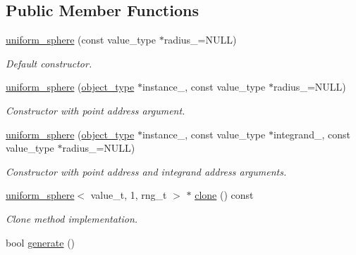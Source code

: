 \subsection*{Public Member Functions}
\begin{DoxyCompactItemize}
\item 
\hypertarget{a00567_a875be167ffb06c494c21cd9a60e8099a}{}\hyperlink{a00567_a875be167ffb06c494c21cd9a60e8099a}{uniform\+\_\+sphere} (const value\+\_\+type $\ast$radius\+\_\+=N\+U\+L\+L)\label{a00567_a875be167ffb06c494c21cd9a60e8099a}

\begin{DoxyCompactList}\small\item\em Default constructor. \end{DoxyCompactList}\item 
\hypertarget{a00567_a922e77d9935b9ff757ed182f9b966cf2}{}\hyperlink{a00567_a922e77d9935b9ff757ed182f9b966cf2}{uniform\+\_\+sphere} (\hyperlink{a00579}{object\+\_\+type} $\ast$instance\+\_\+, const value\+\_\+type $\ast$radius\+\_\+=N\+U\+L\+L)\label{a00567_a922e77d9935b9ff757ed182f9b966cf2}

\begin{DoxyCompactList}\small\item\em Constructor with point address argument. \end{DoxyCompactList}\item 
\hypertarget{a00567_a9b70d5ad8b6301ea8760165005e5c28f}{}\hyperlink{a00567_a9b70d5ad8b6301ea8760165005e5c28f}{uniform\+\_\+sphere} (\hyperlink{a00579}{object\+\_\+type} $\ast$instance\+\_\+, const value\+\_\+type $\ast$integrand\+\_\+, const value\+\_\+type $\ast$radius\+\_\+=N\+U\+L\+L)\label{a00567_a9b70d5ad8b6301ea8760165005e5c28f}

\begin{DoxyCompactList}\small\item\em Constructor with point address and integrand address arguments. \end{DoxyCompactList}\item 
\hypertarget{a00567_a49bc2c31def57ff2615fd22779e2ddf8}{}\hyperlink{a00566}{uniform\+\_\+sphere}$<$ value\+\_\+t, 1, rng\+\_\+t $>$ $\ast$ \hyperlink{a00567_a49bc2c31def57ff2615fd22779e2ddf8}{clone} () const \label{a00567_a49bc2c31def57ff2615fd22779e2ddf8}

\begin{DoxyCompactList}\small\item\em Clone method implementation. \end{DoxyCompactList}\item 
\hypertarget{a00567_a794960777078db27c1b1e7d8fe7e0b38}{}bool \hyperlink{a00567_a794960777078db27c1b1e7d8fe7e0b38}{generate} ()\label{a00567_a794960777078db27c1b1e7d8fe7e0b38}


\end{DoxyCompactItemize}
